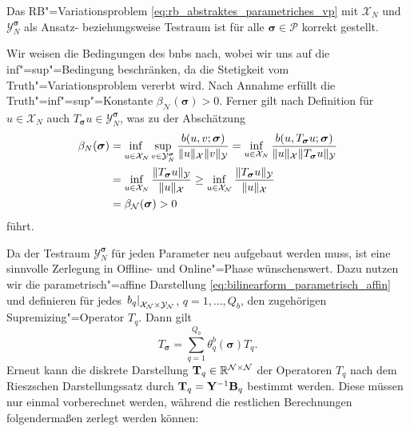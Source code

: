 \documentclass[../main.tex]{subfiles}
\begin{document}
\begin{Satz}\label{satz:rb_testraum_liefert_korrekt_gestelltes_problem}
    Das RB"=Variationsproblem \cref{eq:rb_abstraktes_parametriches_vp} mit $\mathcal X_{N}$ und $\mathcal Y_{N}^{\bm \sigma}$ als Ansatz- beziehungsweise Testraum ist für alle $\bm \sigma \in \mathcal P$ korrekt gestellt.

    \begin{Beweis}
        Wir weisen die Bedingungen des \acl{bnb}s nach, wobei wir uns auf die inf"=sup"=Bedingung beschränken, da die Stetigkeit vom Truth"=Variationsproblem vererbt wird.
        Nach Annahme erfüllt die Truth"=inf"=sup"=Konstante $\beta_{\mathcal N}(\bm \sigma) > 0$.
        Ferner gilt nach Definition für $u \in \mathcal X_{N}$ auch $T_{\bm \sigma}u \in \mathcal Y_{N}^{\bm \sigma}$, was zu der Abschätzung
        \begin{equation}
            \begin{aligned}
                \beta_{N}(\bm \sigma)
                &= \infsup{u \in \mathcal X_{N}}{v \in \mathcal Y_{N}^{\bm \sigma}} \frac{b(u, v; \bm \sigma)}{\norm{u}_{\mathcal X} \norm{v}_{\mathcal Y}}
                = \inf_{u \in \mathcal X_{N}} \frac{b(u, T_{\bm \sigma}u; \bm \sigma)}{\norm{u}_{\mathcal X} \norm{T_{\bm \sigma} u}_{\mathcal Y}}
                \\&= \inf_{u \in \mathcal X_{N}} \frac{\norm{T_{\bm \sigma}u}_{\mathcal Y}}{\norm{u}_{\mathcal X}}
                \geq \inf_{u \in \mathcal X_{\mathcal N}} \frac{\norm{T_{\bm \sigma}u}_{\mathcal Y}}{\norm{u}_{\mathcal X}}
                \\&= \beta_{\mathcal N}(\bm \sigma) > 0
            \end{aligned}
        \end{equation}
        führt.
    \end{Beweis}
\end{Satz}

Da der Testraum $\mathcal Y_{N}^{\bm \sigma}$ für jeden Parameter neu aufgebaut werden muss, ist eine sinnvolle Zerlegung in Offline- und Online"=Phase wünschenswert.
Dazu nutzen wir die parametrisch"=affine Darstellung \cref{eq:bilinearform_parametrisch_affin} und definieren für jedes $\left.b_{q}\right|_{\mathcal X_{\mathcal N} \times \mathcal Y_{\mathcal N}}$, $q = 1, \dots, Q_b$, den zugehörigen Supremizing"=Operator $T_{q}$.
Dann gilt
\begin{equation}
    T_{\bm \sigma} = \sum_{q = 1}^{Q_b} \theta_{q}^{b}(\bm \sigma) T_{q}.
\end{equation}
Erneut kann die diskrete Darstellung $\mathbf{T}_{q} \in \mathbb{R}^{\mathcal N \times \mathcal N}$ der Operatoren $T_q$ nach dem Rieszschen Darstellungssatz durch $\mathbf{T}_{q} = \mathbf{Y}^{-1} \mathbf{B}_{q}$ bestimmt werden.
Diese müssen nur einmal vorberechnet werden, während die restlichen Berechnungen folgendermaßen zerlegt werden können:
\end{document}
